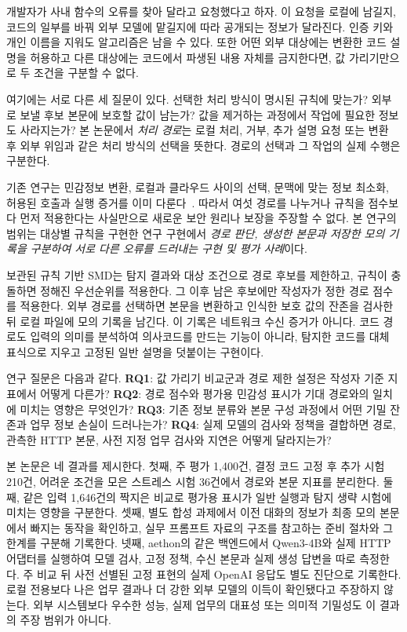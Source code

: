 \documentclass[10pt,letterpaper,twocolumn]{article}
\begin{document}
개발자가 사내 함수의 오류를 찾아 달라고 요청했다고 하자. 이 요청을 로컬에 남길지, 코드의 일부를 바꿔 외부 모델에 맡길지에 따라 공개되는 정보가 달라진다. 인증 키와 개인 이름을 지워도 알고리즘은 남을 수 있다. 또한 어떤 외부 대상에는 변환한 코드 설명을 허용하고 다른 대상에는 코드에서 파생된 내용 자체를 금지한다면, 값 가리기만으로 두 조건을 구분할 수 없다.

여기에는 서로 다른 세 질문이 있다. 선택한 처리 방식이 명시된 규칙에 맞는가? 외부로 보낼 후보 본문에 보호할 값이 남는가? 값을 제거하는 과정에서 작업에 필요한 정보도 사라지는가? 본 논문에서 \emph{처리 경로}는 로컬 처리, 거부, 추가 설명 요청 또는 변환 후 외부 위임과 같은 처리 방식의 선택을 뜻한다. 경로의 선택과 그 작업의 실제 수행은 구분한다.

기존 연구는 민감정보 변환, 로컬과 클라우드 사이의 선택, 문맥에 맞는 정보 최소화, 허용된 호출과 실행 증거를 이미 다룬다~\citep{portcullis,prism,airgap,evidence}. 따라서 여섯 경로를 나누거나 규칙을 점수보다 먼저 적용한다는 사실만으로 새로운 보안 원리나 보장을 주장할 수 없다. 본 연구의 범위는 대상별 규칙을 구현한 연구 구현에서 \emph{경로 판단, 생성한 본문과 저장한 모의 기록을 구분하여 서로 다른 오류를 드러내는 구현 및 평가 사례}이다.

보관된 규칙 기반 SMD는 탐지 결과와 대상 조건으로 경로 후보를 제한하고, 규칙이 충돌하면 정해진 우선순위를 적용한다. 그 이후 남은 후보에만 작성자가 정한 경로 점수를 적용한다. 외부 경로를 선택하면 본문을 변환하고 인식한 보호 값의 잔존을 검사한 뒤 로컬 파일에 모의 기록을 남긴다. 이 기록은 네트워크 수신 증거가 아니다. 코드 경로도 입력의 의미를 분석하여 의사코드를 만드는 기능이 아니라, 탐지한 코드를 대체 표식으로 지우고 고정된 일반 설명을 덧붙이는 구현이다.

연구 질문은 다음과 같다. \textbf{RQ1}: 값 가리기 비교군과 경로 제한 설정은 작성자 기준 지표에서 어떻게 다른가? \textbf{RQ2}: 경로 점수와 평가용 민감성 표시가 기대 경로와의 일치에 미치는 영향은 무엇인가? \textbf{RQ3}: 기존 정보 분류와 본문 구성 과정에서 어떤 기밀 잔존과 업무 정보 손실이 드러나는가? \textbf{RQ4}: 실제 모델의 검사와 정책을 결합하면 경로, 관측한 HTTP 본문, 사전 지정 업무 검사와 지연은 어떻게 달라지는가?

본 논문은 네 결과를 제시한다. 첫째, 주 평가 1,400건, 결정 코드 고정 후 추가 시험 210건, 어려운 조건을 모은 스트레스 시험 36건에서 경로와 본문 지표를 분리한다. 둘째, 같은 입력 1,646건의 짝지은 비교로 평가용 표시가 일반 실행과 탐지 생략 시험에 미치는 영향을 구분한다. 셋째, 별도 합성 과제에서 이전 대화의 정보가 최종 모의 본문에서 빠지는 동작을 확인하고, 실무 프롬프트 자료의 구조를 참고하는 준비 절차와 그 한계를 구분해 기록한다. 넷째, aethon의 같은 백엔드에서 Qwen3-4B와 실제 HTTP 어댑터를 실행하여 모델 검사, 고정 정책, 수신 본문과 실제 생성 답변을 따로 측정한다. 주 비교 뒤 사전 선별된 고정 표현의 실제 OpenAI 응답도 별도 진단으로 기록한다. 로컬 전용보다 나은 업무 결과나 더 강한 외부 모델의 이득이 확인됐다고 주장하지 않는다. 외부 시스템보다 우수한 성능, 실제 업무의 대표성 또는 의미적 기밀성도 이 결과의 주장 범위가 아니다.
\end{document}
